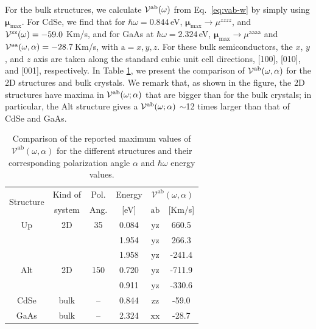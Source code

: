 \documentclass[floatfix,prb,aps,superscriptaddress,showpacs,11pt,preprint,letterpaper]{revtex4}
\begin{document}
For the bulk structures, we calculate ${\cal V}^{\mathrm{a}\mathrm{b}}(\omega)$
from Eq.~\eqref{eq:vab-w} by simply using $\boldsymbol{\mu}_{\mathrm{max}}$. For
CdSe, we find that for $\hbar\omega=0.844$\,eV,
$\boldsymbol{\mu}_{\mathrm{max}}\to \mu^{zzzz}$, and ${\cal
V}^{\mathrm{z}\mathrm{z}}(\omega)=-59.0$ Km/s, and for GaAs at
$\hbar\omega=2.324$\,eV, $\boldsymbol{\mu}_{\mathrm{max}}\to\mu^{\mathrm{aaaa}}$
and ${\cal V}^{\mathrm{a}\mathrm{a}}(\omega,\alpha)=-28.7$\,Km/s, with
$\mathrm{a}=x,y,z$. For these bulk semiconductors, the $x$, $y$, and $z$ axis
are taken along the standard cubic unit cell directions, [100], [010], and
[001], respectively. In Table \ref{tab:vab-str-comp}, we present the comparison
of ${\cal V}^{\mathrm{a}\mathrm{b}}(\omega,\alpha)$ for the 2D structures and
bulk crystals. We remark that, as shown in the figure, the 2D structures have
maxima in ${\cal V}^{\mathrm{a}\mathrm{b}}(\omega;\alpha)$ that are bigger than
for the bulk crystals; in particular, the Alt structure gives a ${\cal
V}^{\mathrm{a}\mathrm{b}}(\omega;\alpha)$ $\sim$12 times larger than that of
CdSe and GaAs.
\begin{table}%
\begin{tabular}{cccccc}
\hline
\multirow{2}{*}{Structure \quad} & 
Kind of \quad & 
Pol. &
Energy & 
\multicolumn{2}{c}{$\mathcal{V}^{\mathrm{ab}}(\omega,\alpha)$}\\
\cline{5-6}
& system & Ang. & [eV] & $\mathrm{ab}$ \quad & [Km/s]\\
\hline
Up    & 2D   & 35    & 0.084  & $\mathrm{yz}$ &  660.5 \\
      &      &       & 1.954  & $\mathrm{yz}$ &  266.3 \\
      &      &       & 1.958  & $\mathrm{yz}$ & -241.4 \\
Alt   & 2D   & 150   & 0.720  & $\mathrm{yz}$ & -711.9 \\
      &      &       & 0.911  & $\mathrm{yz}$ & -330.6 \\
CdSe  & bulk & --    & 0.844  & $\mathrm{zz}$ &  -59.0 \\
GaAs  & bulk & --    & 2.324  & $\mathrm{xx}$ &  -28.7 \\
\hline
\end{tabular}
\caption{Comparison of the reported maximum values of $\mathcal{V}^{\mathrm{ab}}
(\omega,\alpha)$ for the different structures and their corresponding
polarization angle $\alpha$ and $\hbar\omega$ energy values. }
\label{tab:vab-str-comp}
\end{table}
\end{document}

